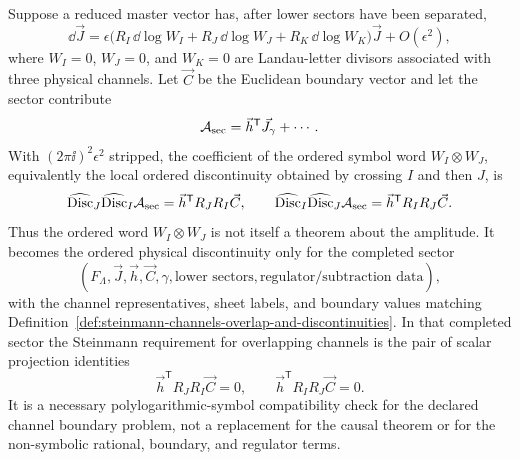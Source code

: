 \begin{construction}
\label{constr:symbol-steinmann-projection-test}
Suppose a reduced master vector has, after lower sectors have been separated,
\begin{equation}
  \dd\vec J
  =
  \epsilon
  \bigl(
    R_I\,\dd\log W_I
    +R_J\,\dd\log W_J
    +R_K\,\dd\log W_K
  \bigr)\vec J
  +O(\epsilon^2),
  \label{eq:symbol-steinmann-canonical-system}
\end{equation}
where \(W_I=0\), \(W_J=0\), and \(W_K=0\) are Landau-letter divisors
associated with three physical channels.  Let \(\vec C\) be the Euclidean
boundary vector and let the sector contribute
\[
  \mathcal A_{\rm sec}=\vec h^{\mathsf T}\vec J_\gamma+\cdots .
\]
With \((2\pi\ii)^2\epsilon^2\) stripped, the coefficient of the ordered
symbol word \(W_I\otimes W_J\), equivalently the local ordered discontinuity
obtained by crossing \(I\) and then \(J\), is
\begin{equation}
  \widehat{\operatorname{Disc}}_J
  \widehat{\operatorname{Disc}}_I
  \mathcal A_{\rm sec}
  =
  \vec h^{\mathsf T}R_JR_I\vec C ,
  \qquad
  \widehat{\operatorname{Disc}}_I
  \widehat{\operatorname{Disc}}_J
  \mathcal A_{\rm sec}
  =
  \vec h^{\mathsf T}R_IR_J\vec C .
  \label{eq:symbol-steinmann-ordered-products}
\end{equation}
Thus the ordered word \(W_I\otimes W_J\) is not itself a theorem about the
amplitude.  It becomes the ordered physical discontinuity only for the completed
sector
\[
  (F_\Lambda,\vec J,\vec h,\vec C,\gamma,\text{lower sectors},
  \text{regulator/subtraction data}),
\]
with the channel representatives, sheet labels, and boundary values matching
Definition~\ref{def:steinmann-channels-overlap-and-discontinuities}.  In that
completed sector the Steinmann requirement for overlapping channels is the
pair of scalar projection identities
\begin{equation}
  \vec h^{\mathsf T}R_JR_I\vec C=0,
  \qquad
  \vec h^{\mathsf T}R_IR_J\vec C=0 .
  \label{eq:symbol-steinmann-projection-identities}
\end{equation}
It is a necessary polylogarithmic-symbol compatibility check for the declared
channel boundary problem, not a replacement for the causal theorem or for the
non-symbolic rational, boundary, and regulator terms.


\end{construction}
